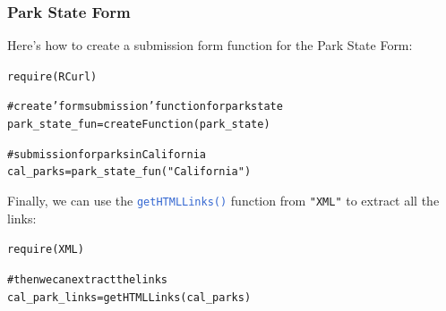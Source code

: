 \documentclass{beamer}\usepackage[]{graphicx}\usepackage[]{color}
\makeatletter
\newcommand{\hlstr}[1]{\textcolor[rgb]{0.063,0.58,0.627}{#1}}%
\newcommand{\hlcom}[1]{\textcolor[rgb]{0.588,0.588,0.588}{#1}}%
\newcommand{\hlstd}[1]{\textcolor[rgb]{0.196,0.196,0.196}{#1}}%
\newcommand{\hlkwb}[1]{\textcolor[rgb]{0.627,0,0.314}{#1}}%
\newcommand{\hlkwd}[1]{\textcolor[rgb]{0.78,0.227,0.412}{#1}}%
\newenvironment{kframe}{%
 \def\at@end@of@kframe{}%
 \ifinner\ifhmode%
  \def\at@end@of@kframe{\end{minipage}}%
  \begin{minipage}{\columnwidth}%
 \fi\fi%
 \def\FrameCommand##1{\hskip\@totalleftmargin \hskip-\fboxsep
 \colorbox{shadecolor}{##1}\hskip-\fboxsep
     \hskip-\linewidth \hskip-\@totalleftmargin \hskip\columnwidth}%
 \MakeFramed {\advance\hsize-\width
   \@totalleftmargin\z@ \linewidth\hsize
   \@setminipage}}%
 {\par\unskip\endMakeFramed%
 \at@end@of@kframe}
\newenvironment{knitrout}{}{} %
\newcommand{\code}[1]{\texttt{#1}}
\newcommand{\highcode}[1]{\textcolor{highlight}{\texttt{#1}}}
\makeatother
\begin{document}
\begin{frame}[fragile]
\frametitle{Park State Form}

Here's how to create a submission form function for the Park State Form:

\begin{knitrout}\tiny
{}\color{fgcolor}\begin{kframe}
\begin{alltt}
\hlkwd{require}\hlstd{(RCurl)}

\hlcom{# create 'form submission' function for park state}
\hlstd{park_state_fun} \hlkwb{=} \hlkwd{createFunction}\hlstd{(park_state)}

\hlcom{# submission for parks in California}
\hlstd{cal_parks} \hlkwb{=} \hlkwd{park_state_fun}\hlstd{(}\hlstr{"California"}\hlstd{)}
\end{alltt}
\end{kframe}
\end{knitrout}

Finally, we can use the \highcode{getHTMLLinks()} function from \code{"XML"} to extract all the links:

\begin{knitrout}\tiny
{}\color{fgcolor}\begin{kframe}
\begin{alltt}
\hlkwd{require}\hlstd{(XML)}

\hlcom{# then we can extract the links }
\hlstd{cal_park_links} \hlkwb{=} \hlkwd{getHTMLLinks}\hlstd{(cal_parks)}
\end{alltt}
\end{kframe}
\end{knitrout}

\end{frame}

\end{document}

